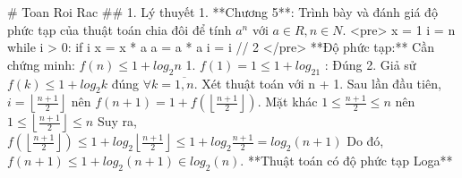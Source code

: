 # Toan Roi Rac
## 1. Lý thuyết
1. **Chương 5**: Trình bày và đánh giá độ phức tạp của thuật toán chia đôi để tính $a^n$ với $a\in R, n \in N$.
    <pre>
    x = 1
    i = n
    while i > 0:
        if i %
            x = x * a
        a = a * a
        i = i // 2
    </pre>
    **Độ phức tạp:**
    Cần chứng minh: $f(n) \leq 1 + log_2n$
    1. $f(1) = 1  \leq 1 + log_21$ : Đúng
    2. Giả sử $f(k) \leq 1 + log_2k$ đúng $\forall k=\overline{1,n}$. Xét thuật toán với n + 1. 
    Sau lần đầu tiên, $i = \left\lfloor \frac{n+1}{2} \right\rfloor$ nên $f(n+1) = 1 + f(\left\lfloor \frac{n+1}{2} \right\rfloor)$. 
    Mặt khác $1 \leq \frac{n+1}{2} \leq n$ nên $1 \leq \left\lfloor \frac{n+1}{2} \right\rfloor \leq n$
    Suy ra, $f(\left\lfloor \frac{n+1}{2} \right\rfloor) \leq 1 + log_2\left\lfloor \frac{n+1}{2} \right\rfloor \leq 1 + log_2\frac{n+1}{2} =log_2(n+1)$
    Do đó, $f(n+1) \leq 1 + log_2(n+1) \in log_2(n)$. **Thuật toán có độ phức tạp Loga**

